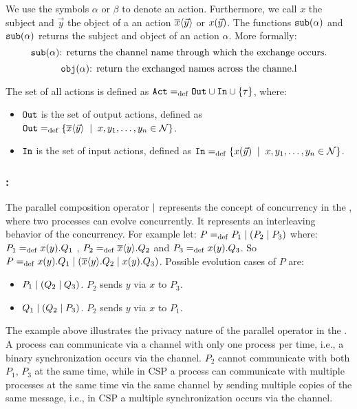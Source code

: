 We use the symbols $\alpha$ or $\beta$ to denote an action. Furthermore, we call $x$ the subject and $\vec{y}$ the object of a an action $\overline{x}\langle\vec{y}\rangle$ or $x(\vec{y})$. The functions  $\mathtt{sub}(\alpha)$ and $\mathtt{sub}(\alpha)$ returns the subject and object of an action $\alpha$. More formally:
\[\mathtt{sub}(\alpha) \text{: returns the channel name through which the exchange occurs.}\]
\[\mathtt{obj}(\alpha) \text{: return the exchanged names across the channe.l}\]

The set of all actions is defined as $\actions\define\outA\cup\inA\cup\set{\tau}$, where:
\begin{itemize}
\item $\mathtt{Out}$ is the set of output actions, defined as $\outA\define\set[x,y_1,\dots,y_n\in\names]{\out{x}{\vec{y}}}$.
\item $\mathtt{In}$ is the set of input actions, defined as $\inA\define\set[x,y_1,\dots,y_n\in\names]{\inp{x}{\vec{y}}}$.
\end{itemize}
\subsubsection{:}
The parallel composition operator $\mid$ represents the concept of concurrency in the \picalc{}, where two processes can evolve concurrently. It represents an interleaving behavior of the concurrency.
For example let:  $P=_{\mathrm{def}}P_1 \mid (P_2 \mid P_3)$ where: $P_1=_{\mathrm{def}}x(y).Q_1$ , $P_2=_{\mathrm{def}}\overline{x}\langle y\rangle.Q_2$ and $P_3=_{\mathrm{def}}x(y).Q_3$. So $P=_{\mathrm{def}}x(y).Q_1 \mid (\overline{x}\langle y\rangle.Q_2 \mid x(y).Q_3)$.
Possible evolution cases of $P$ are:
\begin{itemize}
\item $P_1 \mid (Q_2 \mid Q_3)$. $P_2$ sends $y$ via $x$ to $P_3$.
\item $Q_1 \mid (Q_2 \mid P_3)$. $P_2$ sends $y$ via $x$ to $P_1$.
\end{itemize}

The example above illustrates the privacy nature of the parallel operator in the \picalc{}. A process can communicate via a channel with only one process per time, i.e., a binary synchronization occurs via the channel. $P_2$ cannot communicate with both $P_1$, $P_3$ at the same time, while in \gls{CSP} a process can communicate with multiple processes at the same time via the same channel by sending multiple copies of the same message, i.e., in CSP a multiple synchronization occurs via the channel.


